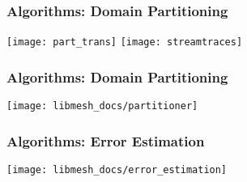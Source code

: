 \frame
{
  \frametitle{Algorithms: Domain Partitioning}
  \begin{center}
    \texttt{[image: part\_trans]}
    \texttt{[image: streamtraces]}
  \end{center}  
}



\frame
{
  \frametitle{Algorithms: Domain Partitioning}
  \begin{center}
    \texttt{[image: libmesh\_docs/partitioner]}
  \end{center}
}


\frame
{
  \frametitle{Algorithms: Error Estimation}
  \begin{center}
    \texttt{[image: libmesh\_docs/error\_estimation]}
  \end{center}
}





